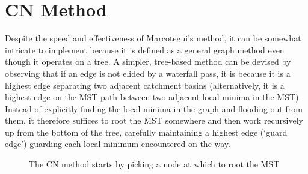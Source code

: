 \documentclass[a4paper]{article}
\newenvironment{stusubfig}[1]
{
	\begin{figure}[#1]
	\begin{center}
}
{
	\end{center}
	\end{figure}
}
\begin{document}
\section{CN Method}
\label{sec:nicholls}

Despite the speed and effectiveness of Marcotegui's method, it can be somewhat intricate to implement \cite{golodetz08} because it is defined as a general graph method even though it operates on a tree. A simpler, tree-based method can be devised by observing that if an edge is not elided by a waterfall pass, it is because it is a highest edge separating two adjacent catchment basins (alternatively, it is a highest edge on the MST path between two adjacent local minima in the MST). Instead of explicitly finding the local minima in the graph and flooding out from them, it therefore suffices to root the MST somewhere and then work recursively up from the bottom of the tree, carefully maintaining a highest edge (`guard edge') guarding each local minimum encountered on the way.

\begin{stusubfig}{p}
	\hspace{4mm}%
\caption{The CN method starts by picking a node at which to root the MST}%
\label{fig:segmentation-waterfall-nicholls-root}
\end{stusubfig}
\end{document}
